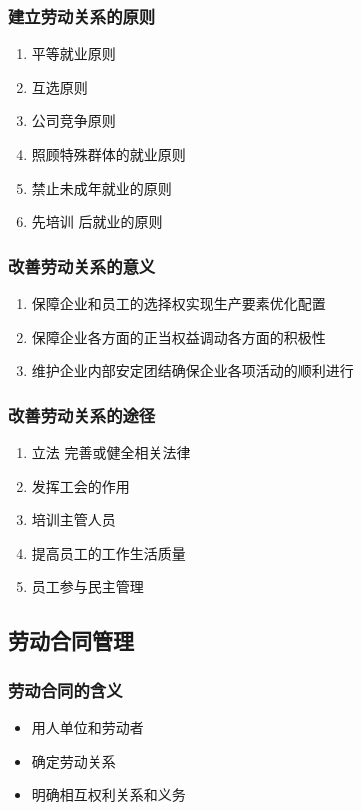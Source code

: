 \documentclass{ctexart}
\begin{document}
\subsubsection{建立劳动关系的原则}
\label{sec-3-1-4}
\begin{enumerate}
\item 平等就业原则
\label{sec-3-1-4-1}
\item 互选原则
\label{sec-3-1-4-2}
\item 公司竞争原则
\label{sec-3-1-4-3}
\item 照顾特殊群体的就业原则
\label{sec-3-1-4-4}
\item 禁止未成年就业的原则
\label{sec-3-1-4-5}
\item 先培训 后就业的原则
\label{sec-3-1-4-6}
\end{enumerate}
\subsubsection{改善劳动关系的意义}
\label{sec-3-1-5}
\begin{enumerate}
\item 保障企业和员工的选择权实现生产要素优化配置
\label{sec-3-1-5-1}
\item 保障企业各方面的正当权益调动各方面的积极性
\label{sec-3-1-5-2}
\item 维护企业内部安定团结确保企业各项活动的顺利进行
\label{sec-3-1-5-3}
\end{enumerate}
\subsubsection{改善劳动关系的途径}
\label{sec-3-1-6}
\begin{enumerate}
\item 立法 完善或健全相关法律
\label{sec-3-1-6-1}
\item 发挥工会的作用
\label{sec-3-1-6-2}
\item 培训主管人员
\label{sec-3-1-6-3}
\item 提高员工的工作生活质量
\label{sec-3-1-6-4}
\item 员工参与民主管理
\label{sec-3-1-6-5}
\end{enumerate}
\subsection{劳动合同管理}
\label{sec-3-2}
\subsubsection{劳动合同的含义}
\label{sec-3-2-1}
\begin{itemize}
\item 用人单位和劳动者
\item 确定劳动关系
\item 明确相互权利关系和义务
\end{itemize}
\end{document}

